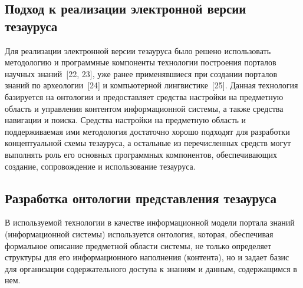 \begin{multicols}{2}
\section{Подход к реализации электронной версии тезауруса}

  Для реализации электронной версии тезауруса было решено использовать методологию и 
программные компоненты технологии построения\linebreak
порталов научных знаний~[22, 23], уже 
ранее применявшиеся при создании порталов знаний по археологии~[24] и компьютерной 
лингвистике~[25].\linebreak
Данная технология базируется на онтологии и предоставляет средства 
настройки на предметную область и управления контентом информационной системы, а 
также средства навигации и поиска. Средства настройки на предметную область и 
поддерживаемая ими методология достаточно хорошо подходят для разработки 
концептуальной схемы тезауруса, а остальные из перечисленных средств могут выполнять 
роль его основных программных компонентов, обеспечивающих создание, сопровождение и 
использование тезауруса.

\subsection{Разработка онтологии представления тезауруса}

  В используемой технологии в качестве информационной модели портала знаний 
(информа\-ци\-он\-ной системы) используется онтология, \mbox{которая}, обеспечивая формальное 
описание предметной области системы, не только определяет структуры для его 
информационного наполнения (контента), но и задает базис для организации 
содержательного доступа к знаниям и данным, содержащимся в нем.
  

\end{multicols}

